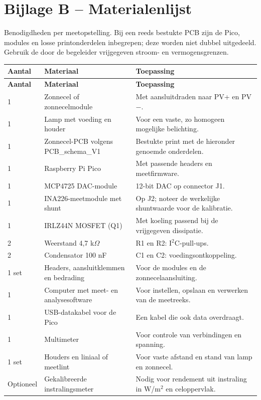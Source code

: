 \documentclass[a4paper,10pt]{article}
\begin{document}
\section*{Bijlage B -- Materialenlijst}
Benodigdheden per meetopstelling. Bij een reeds bestukte PCB zijn de Pico, modules en losse printonderdelen inbegrepen; deze worden niet dubbel uitgedeeld. Gebruik de door de begeleider vrijgegeven stroom- en vermogensgrenzen.

{\small
\begin{longtable}{@{}P{1.5cm}P{6cm}P{8.3cm}@{}}
\toprule
\textbf{Aantal} & \textbf{Materiaal} & \textbf{Toepassing} \\
\midrule
\endfirsthead
\toprule
\textbf{Aantal} & \textbf{Materiaal} & \textbf{Toepassing} \\
\midrule
{} & Zonnecel of zonnecelmodule & Met aansluitdraden naar PV+ en PV$-$. \\
1 & Lamp met voeding en houder & Voor een vaste, zo homogeen mogelijke belichting. \\
1 & Zonnecel-PCB volgens PCB\_schema\_V1 & Bestukte print met de hieronder genoemde onderdelen. \\
1 & Raspberry Pi Pico & Met passende headers en meetfirmware. \\
1 & MCP4725 DAC-module & 12-bit DAC op connector J1. \\
1 & INA226-meetmodule met shunt & Op J2; noteer de werkelijke shuntwaarde voor de kalibratie. \\
1 & IRLZ44N MOSFET (Q1) & Met koeling passend bij de vrijgegeven dissipatie. \\
2 & Weerstand 4,7 k$\Omega$ & R1 en R2: I$^2$C-pull-ups. \\
2 & Condensator 100 nF & C1 en C2: voedingsontkoppeling. \\
1 set & Headers, aansluitklemmen en bedrading & Voor de modules en de zonnecelaansluiting. \\
1 & Computer met meet- en analysesoftware & Voor instellen, opslaan en verwerken van de meetreeks. \\
1 & USB-datakabel voor de Pico & Een kabel die ook data overdraagt. \\
1 & Multimeter & Voor controle van verbindingen en spanning. \\
1 set & Houders en liniaal of meetlint & Voor vaste afstand en stand van lamp en zonnecel. \\
Optioneel & Gekalibreerde instralingsmeter & Nodig voor rendement uit instraling in W/m$^2$ en celoppervlak. \\
\bottomrule
\end{longtable}
}
\end{document}
